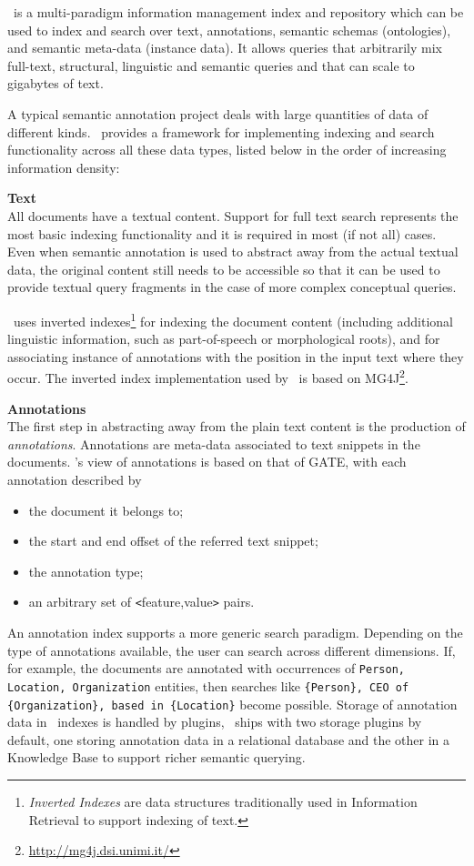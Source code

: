 \Mimir\ is a multi-paradigm information management index and repository which
can be used to index and search over text, annotations, semantic schemas
(ontologies), and semantic meta-data (instance data). It allows queries that
arbitrarily mix full-text, structural, linguistic and semantic queries and that
can scale to gigabytes of text.

A typical semantic annotation project deals with large quantities of data of
different kinds. \Mimir\ provides a framework for implementing indexing and
search functionality across all these data types, listed below in the order of
increasing information density:

{\bf Text}\\
All documents have a textual content. Support for full text search represents
the most basic indexing functionality and it is required in most (if not all)
cases.  Even when semantic annotation is used to abstract away from the
actual textual data, the original content still needs to be accessible so
that it can be used to provide textual query fragments in the case of more
complex conceptual queries.

\Mimir\ uses inverted indexes\footnote{{\em Inverted Indexes} are data
structures traditionally used in Information Retrieval to support indexing of
text.} for indexing the document content (including additional linguistic
information, such as part-of-speech or morphological roots), and for
associating instance of annotations with the position in the input text where
they occur. The inverted index implementation used by \Mimir\ is based on
MG4J\footnote{\url{http://mg4j.dsi.unimi.it/}}.

{\bf Annotations}\\
The first step in abstracting away from the plain text content is the
production of {\em annotations}. Annotations are meta-data associated to text
snippets in the documents. \Mimir's view of annotations is based on that of
GATE, with each annotation described by
\begin{itemize}
  \item the document it belongs to;
  \item the start and end offset of the referred text snippet;
  \item the annotation type;
  \item an arbitrary set of \verb!<!feature,value\verb!>! pairs.
\end{itemize}

An annotation index supports a more generic search paradigm. Depending on the
type of annotations available, the user can search across different dimensions.
If, for example, the documents are annotated with occurrences of {\tt Person,
Location, Organization} entities, then searches like {\tt \{Person\}, CEO of
\{Organization\}, based in \{Location\}} become possible.  Storage of
annotation data in \Mimir\ indexes is handled by plugins, \Mimir\ ships with
two storage plugins by default, one storing annotation data in a relational
database and the other in a Knowledge Base to support richer semantic querying.

